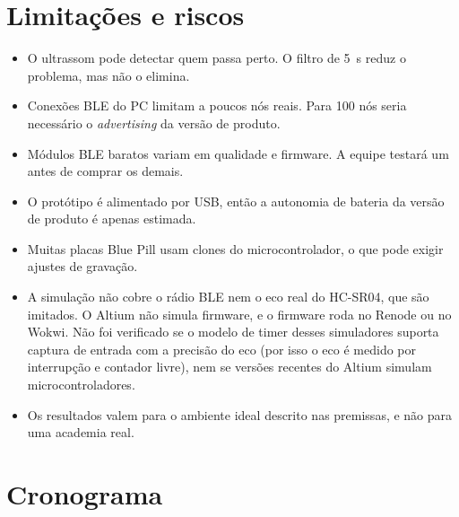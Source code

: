 \documentclass[11pt,a4paper]{article}
\begin{document}
\section{Limitações e riscos}

\begin{itemize}
  \item O ultrassom pode detectar quem passa perto. O filtro de 5~s reduz o
        problema, mas não o elimina.
  \item Conexões BLE do PC limitam a poucos nós reais. Para 100 nós seria
        necessário o \emph{advertising} da versão de produto.
  \item Módulos BLE baratos variam em qualidade e firmware. A equipe testará um
        antes de comprar os demais.
  \item O protótipo é alimentado por USB, então a autonomia de bateria da versão
        de produto é apenas estimada.
  \item Muitas placas Blue Pill usam clones do microcontrolador, o que pode
        exigir ajustes de gravação.
  \item A simulação não cobre o rádio BLE nem o eco real do HC-SR04, que são
        imitados. O Altium não simula firmware, e o firmware roda no Renode ou
        no Wokwi. Não foi verificado se o modelo de timer desses simuladores
        suporta captura de entrada com a precisão do eco (por isso o eco é
        medido por interrupção e contador livre), nem se versões recentes do
        Altium simulam microcontroladores.
  \item Os resultados valem para o ambiente ideal descrito nas premissas, e não
        para uma academia real.
\end{itemize}

\section{Cronograma}
\end{document}
